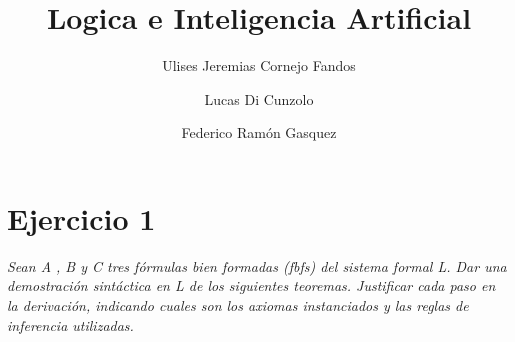 \documentclass[osajnl,twocolumn,showpacs,superscriptaddress,10pt,leqno]{revtex4-1} %
\begin{document}
\title{Logica e Inteligencia Artificial}

\author{Ulises Jeremias Cornejo Fandos}

\author{Lucas Di Cunzolo}

\author{Federico Ramón Gasquez}



\maketitle %

\onecolumngrid

\section{Ejercicio 1}

\textit{Sean A , B y C tres fórmulas bien formadas (fbfs) del sistema formal L. Dar una demostración sintáctica en L de los siguientes teoremas. Justificar cada paso en la derivación, indicando cuales son los axiomas instanciados y las reglas de inferencia utilizadas.}
\end{document}
